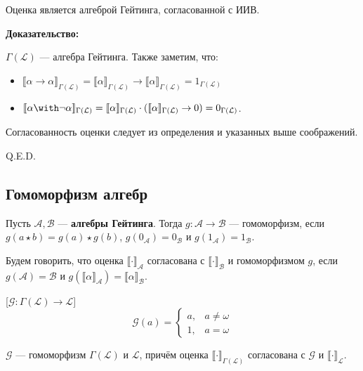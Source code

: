 
Оценка является алгеброй Гейтинга, согласованной с ИИВ.


\textbf{Доказательство:}

$\Gamma(\mathcal{L})$ --- алгебра Гейтинга.
Также заметим, что:
\begin{itemize}
\item $\llbracket \alpha\rightarrow\alpha \rrbracket_{\Gamma(\mathcal{L})} = \llbracket \alpha\rrbracket_{\Gamma(\mathcal{L})}\rightarrow\llbracket\alpha \rrbracket_{\Gamma(\mathcal{L})}
= 1_{\Gamma(\mathcal{L})}$
\item $\llbracket \alpha\with\neg\alpha \rrbracket_{\Gamma(\mathcal{L})} = \llbracket \alpha\rrbracket_{\Gamma(\mathcal{L})} \cdot (\llbracket \alpha\rrbracket_{\Gamma(\mathcal{L})}\rightarrow 0)
= 0_{\Gamma(\mathcal{L})}$.
\end{itemize}

Согласованность оценки следует из определения и указанных выше соображений.

\hfill Q.E.D.

\subsection{Гомоморфизм алгебр}

 Пусть $\mathcal{A}, \mathcal{B}$ --- \textbf{алгебры Гейтинга}. Тогда $g: \mathcal{A} \rightarrow \mathcal{B}$ --- гомоморфизм,
если $g(a \star b) = g(a) \star g(b)$, $g(0_\mathcal{A}) = 0_\mathcal{B}$ и $g(1_\mathcal{A}) = 1_\mathcal{B}$.

 Будем говорить, что оценка $\llbracket\cdot\rrbracket_\mathcal{A}$ согласована
с $\llbracket\cdot\rrbracket_\mathcal{B}$ и гомоморфизмом $g$, если $g(\mathcal{A}) = \mathcal{B}$ и
$g(\llbracket\alpha\rrbracket_\mathcal{A}) = \llbracket\alpha\rrbracket_\mathcal{B}$.


[$\mathcal{G}: \Gamma(\mathcal{L}) \rightarrow \mathcal{L}$]\vspace{-0.5cm}
$$\mathcal{G}(a) = \left\{\begin{array}{ll} a, & a \ne \omega\\
                                  1, & a = \omega\end{array}\right.$$\vspace{-0.5cm}


$\mathcal{G}$ --- гомоморфизм $\Gamma(\mathcal{L})$ и $\mathcal{L}$, причём 
оценка $\llbracket\cdot\rrbracket_{\Gamma(\mathcal{L})}$ согласована с $\mathcal{G}$
и $\llbracket\cdot\rrbracket_\mathcal{L}$.

